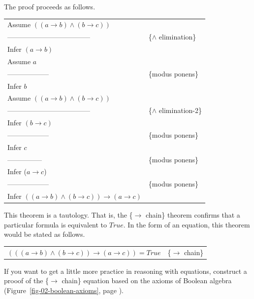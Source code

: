 The proof proceeds as follows.
\begin{center}
\begin{tabular}{ll}
Assume $((a \rightarrow b) \wedge (b \rightarrow c))$ & \\
------------------------------------                  &\{$\wedge$ elimination\} \\
Infer $(a \rightarrow b)$                             & \\
Assume $a$                                            & \\
------------------                                    &\{modus ponens\} \\
Infer $b$                                             & \\
Assume $((a \rightarrow b) \wedge (b \rightarrow c))$ & \\
------------------------------------                  &\{$\wedge$ elimination-2\} \\
Infer $(b \rightarrow c)$                             & \\
------------------                                    &\{modus ponens\} \\
Infer $c$                                             & \\
---------------                                       &\{modus ponens\} \\
Infer ($a \rightarrow c$)                             & \\
------------------                                    &\{modus ponens\} \\
Infer $((a \rightarrow b) \wedge (b \rightarrow c)) \rightarrow (a \rightarrow c)$ & \\
\end{tabular}
\end{center}

This theorem is a tautology. That is, the \{$\rightarrow$ chain\} theorem
confirms that a particular formula is equivalent to $True$.
In the form of an equation, this theorem would be stated as follows.
\begin{center}
\begin{tabular}{ll}
$(((a \rightarrow b) \wedge (b \rightarrow c)) \rightarrow (a \rightarrow c)) = True$ &\{$\rightarrow$ chain\}
\end{tabular}
\end{center}

If you want to get a little more practice in reasoning with equations,
construct a prooof of the \{$\rightarrow$ chain\} equation based on the
axioms of Boolean algebra (Figure~\ref{fig-02-boolean-axioms}, page \pageref{fig-02-boolean-axioms}).

